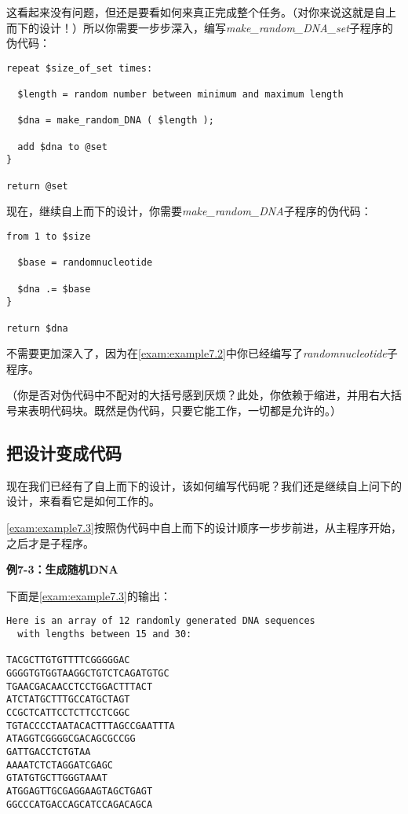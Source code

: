 这看起来没有问题，但还是要看如何来真正完成整个任务。（对你来说这就是自上而下的设计！）所以你需要一步步深入，编写\textit{make\_random\_DNA\_set}子程序的伪代码：

\begin{lstlisting}
repeat $size_of_set times:

  $length = random number between minimum and maximum length

  $dna = make_random_DNA ( $length );

  add $dna to @set
}

return @set
\end{lstlisting}

现在，继续自上而下的设计，你需要\textit{make\_random\_DNA}子程序的伪代码：

\begin{lstlisting}
from 1 to $size

  $base = randomnucleotide

  $dna .= $base
}

return $dna
\end{lstlisting}

不需要更加深入了，因为在\autoref{exam:example7.2}中你已经编写了\textit{randomnucleotide}子程序。

（你是否对伪代码中不配对的大括号感到厌烦？此处，你依赖于缩进，并用右大括号来表明代码块。既然是伪代码，只要它能工作，一切都是允许的。）

\subsection{把设计变成代码}
现在我们已经有了自上而下的设计，该如何编写代码呢？我们还是继续自上问下的设计，来看看它是如何工作的。

\autoref{exam:example7.3}按照伪代码中自上而下的设计顺序一步步前进，从主程序开始，之后才是子程序。

\textbf{例7-3：生成随机DNA}


下面是\autoref{exam:example7.3}的输出：

\begin{lstlisting}
Here is an array of 12 randomly generated DNA sequences
  with lengths between 15 and 30:

TACGCTTGTGTTTTCGGGGGAC
GGGGTGTGGTAAGGCTGTCTCAGATGTGC
TGAACGACAACCTCCTGGACTTTACT
ATCTATGCTTTGCCATGCTAGT
CCGCTCATTCCTCTTCCTCGGC
TGTACCCCTAATACACTTTAGCCGAATTTA
ATAGGTCGGGGCGACAGCGCCGG
GATTGACCTCTGTAA
AAAATCTCTAGGATCGAGC
GTATGTGCTTGGGTAAAT
ATGGAGTTGCGAGGAAGTAGCTGAGT
GGCCCATGACCAGCATCCAGACAGCA
\end{lstlisting}

